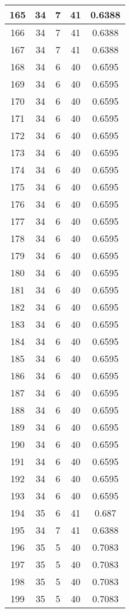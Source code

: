 \documentclass[letterpaper, 12pt]{article}
\begin{document}
\begin{longtable}{|c|c|c|c|c|}
\hline
165 & 34 & 7 & 41 & 0.6388 \\
\hline
166 & 34 & 7 & 41 & 0.6388 \\
\hline
167 & 34 & 7 & 41 & 0.6388 \\
\hline
168 & 34 & 6 & 40 & 0.6595 \\
\hline
169 & 34 & 6 & 40 & 0.6595 \\
\hline
170 & 34 & 6 & 40 & 0.6595 \\
\hline
171 & 34 & 6 & 40 & 0.6595 \\
\hline
172 & 34 & 6 & 40 & 0.6595 \\
\hline
173 & 34 & 6 & 40 & 0.6595 \\
\hline
174 & 34 & 6 & 40 & 0.6595 \\
\hline
175 & 34 & 6 & 40 & 0.6595 \\
\hline
176 & 34 & 6 & 40 & 0.6595 \\
\hline
177 & 34 & 6 & 40 & 0.6595 \\
\hline
178 & 34 & 6 & 40 & 0.6595 \\
\hline
179 & 34 & 6 & 40 & 0.6595 \\
\hline
180 & 34 & 6 & 40 & 0.6595 \\
\hline
181 & 34 & 6 & 40 & 0.6595 \\
\hline
182 & 34 & 6 & 40 & 0.6595 \\
\hline
183 & 34 & 6 & 40 & 0.6595 \\
\hline
184 & 34 & 6 & 40 & 0.6595 \\
\hline
185 & 34 & 6 & 40 & 0.6595 \\
\hline
186 & 34 & 6 & 40 & 0.6595 \\
\hline
187 & 34 & 6 & 40 & 0.6595 \\
\hline
188 & 34 & 6 & 40 & 0.6595 \\
\hline
189 & 34 & 6 & 40 & 0.6595 \\
\hline
190 & 34 & 6 & 40 & 0.6595 \\
\hline
191 & 34 & 6 & 40 & 0.6595 \\
\hline
192 & 34 & 6 & 40 & 0.6595 \\
\hline
193 & 34 & 6 & 40 & 0.6595 \\
\hline
194 & 35 & 6 & 41 & 0.687 \\
\hline
195 & 34 & 7 & 41 & 0.6388 \\
\hline
196 & 35 & 5 & 40 & 0.7083 \\
\hline
197 & 35 & 5 & 40 & 0.7083 \\
\hline
198 & 35 & 5 & 40 & 0.7083 \\
\hline
199 & 35 & 5 & 40 & 0.7083 \\
\hline
\end{longtable}
\end{document}
